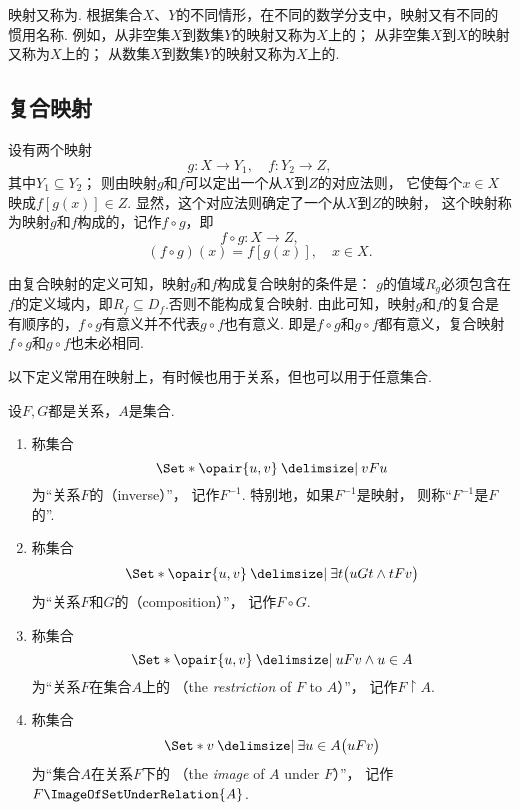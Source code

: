 映射又称为.
根据集合\(X\)、\(Y\)的不同情形，在不同的数学分支中，映射又有不同的惯用名称.
例如，从非空集\(X\)到数集\(Y\)的映射又称为\(X\)上的；
从非空集\(X\)到\(X\)的映射又称为\(X\)上的；
从数集\(X\)到数集\(Y\)的映射又称为\(X\)上的.

\subsection{复合映射}
\begin{definition}
设有两个映射\[
g\colon X \to Y_1, \quad f\colon Y_2 \to Z,
\]其中\(Y_1 \subseteq Y_2\)；
则由映射\(g\)和\(f\)可以定出一个从\(X\)到\(Z\)的对应法则，
它使每个\(x \in X\)映成\(f[g(x)] \in Z\).
显然，这个对应法则确定了一个从\(X\)到\(Z\)的映射，
这个映射称为映射\(g\)和\(f\)构成的，记作\(f \circ g\)，即\[
f \circ g: X \to Z,
\]\[
(f \circ g)(x) = f[g(x)], \quad x \in X.
\]

由复合映射的定义可知，映射\(g\)和\(f\)构成复合映射的条件是：
\(g\)的值域\(R_g\)必须包含在\(f\)的定义域内，即\(R_f \subseteq D_f\).否则不能构成复合映射.
由此可知，映射\(g\)和\(f\)的复合是有顺序的，\(f \circ g\)有意义并不代表\(g \circ f\)也有意义.
即是\(f \circ g\)和\(g \circ f\)都有意义，复合映射\(f \circ g\)和\(g \circ f\)也未必相同.
\end{definition}

以下定义常用在映射上，有时候也用于关系，但也可以用于任意集合.
\begin{definition}
设\(F,G\)都是关系，\(A\)是集合.
\begin{enumerate}
	\item 称集合\[
		\Set*{ \opair{u,v} \given v F u }
	\]为“关系\(F\)的（inverse）”，
	记作\(F^{-1}\).
	特别地，如果\(F^{-1}\)是映射，
	则称“\(F^{-1}\)是\(F\)的”.

	\item 称集合\[
		\Set*{ \opair{u,v} \given \exists t \bigl( u G t \land t F v \bigr) }
	\]为“关系\(F\)和\(G\)的（composition）”，
	记作\(F \circ G\).

	\item 称集合\[
		\Set*{ \opair{u,v} \given u F v \land u \in A }
	\]为“关系\(F\)在集合\(A\)上的%
	（the \emph{restriction} of \(F\) to \(A\)）”，
	记作\(F \upharpoonright A\).

	\item 称集合\[
		\Set*{ v \given \exists u \in A \bigl( u F v \bigr) }
	\]为“集合\(A\)在关系\(F\)下的%
	（the \emph{image} of \(A\) under \(F\)）”，
	记作\(F\ImageOfSetUnderRelation{A}\).
\end{enumerate}
\end{definition}

